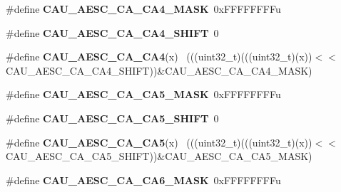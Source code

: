 \begin{DoxyCompactItemize}
\item 
\hypertarget{group___c_a_u___register___masks_ga19b50ba9810cc4a1ebd860aba00dd728}{}\#define {\bfseries C\+A\+U\+\_\+\+A\+E\+S\+C\+\_\+\+C\+A\+\_\+\+C\+A4\+\_\+\+M\+A\+S\+K}~0x\+F\+F\+F\+F\+F\+F\+F\+Fu\label{group___c_a_u___register___masks_ga19b50ba9810cc4a1ebd860aba00dd728}

\item 
\hypertarget{group___c_a_u___register___masks_ga67414b23056892843c13aaed39303c4d}{}\#define {\bfseries C\+A\+U\+\_\+\+A\+E\+S\+C\+\_\+\+C\+A\+\_\+\+C\+A4\+\_\+\+S\+H\+I\+F\+T}~0\label{group___c_a_u___register___masks_ga67414b23056892843c13aaed39303c4d}

\item 
\hypertarget{group___c_a_u___register___masks_gab5a17fd3f27f865acc1b64c9c7e97fc0}{}\#define {\bfseries C\+A\+U\+\_\+\+A\+E\+S\+C\+\_\+\+C\+A\+\_\+\+C\+A4}(x)                                          ~(((uint32\+\_\+t)(((uint32\+\_\+t)(x))$<$$<$C\+A\+U\+\_\+\+A\+E\+S\+C\+\_\+\+C\+A\+\_\+\+C\+A4\+\_\+\+S\+H\+I\+F\+T))\&C\+A\+U\+\_\+\+A\+E\+S\+C\+\_\+\+C\+A\+\_\+\+C\+A4\+\_\+\+M\+A\+S\+K)\label{group___c_a_u___register___masks_gab5a17fd3f27f865acc1b64c9c7e97fc0}

\item 
\hypertarget{group___c_a_u___register___masks_ga0368b4a75631ad41f0d262ea1f42f285}{}\#define {\bfseries C\+A\+U\+\_\+\+A\+E\+S\+C\+\_\+\+C\+A\+\_\+\+C\+A5\+\_\+\+M\+A\+S\+K}~0x\+F\+F\+F\+F\+F\+F\+F\+Fu\label{group___c_a_u___register___masks_ga0368b4a75631ad41f0d262ea1f42f285}

\item 
\hypertarget{group___c_a_u___register___masks_ga4412c36bceb81d934b45def23cb28554}{}\#define {\bfseries C\+A\+U\+\_\+\+A\+E\+S\+C\+\_\+\+C\+A\+\_\+\+C\+A5\+\_\+\+S\+H\+I\+F\+T}~0\label{group___c_a_u___register___masks_ga4412c36bceb81d934b45def23cb28554}

\item 
\hypertarget{group___c_a_u___register___masks_ga04064fa4270cd616d386359ef478e61f}{}\#define {\bfseries C\+A\+U\+\_\+\+A\+E\+S\+C\+\_\+\+C\+A\+\_\+\+C\+A5}(x)                                          ~(((uint32\+\_\+t)(((uint32\+\_\+t)(x))$<$$<$C\+A\+U\+\_\+\+A\+E\+S\+C\+\_\+\+C\+A\+\_\+\+C\+A5\+\_\+\+S\+H\+I\+F\+T))\&C\+A\+U\+\_\+\+A\+E\+S\+C\+\_\+\+C\+A\+\_\+\+C\+A5\+\_\+\+M\+A\+S\+K)\label{group___c_a_u___register___masks_ga04064fa4270cd616d386359ef478e61f}

\item 
\hypertarget{group___c_a_u___register___masks_ga12df900e0ab49a2eb0e596f184a22d02}{}\#define {\bfseries C\+A\+U\+\_\+\+A\+E\+S\+C\+\_\+\+C\+A\+\_\+\+C\+A6\+\_\+\+M\+A\+S\+K}~0x\+F\+F\+F\+F\+F\+F\+F\+Fu\label{group___c_a_u___register___masks_ga12df900e0ab49a2eb0e596f184a22d02}


\end{DoxyCompactItemize}
